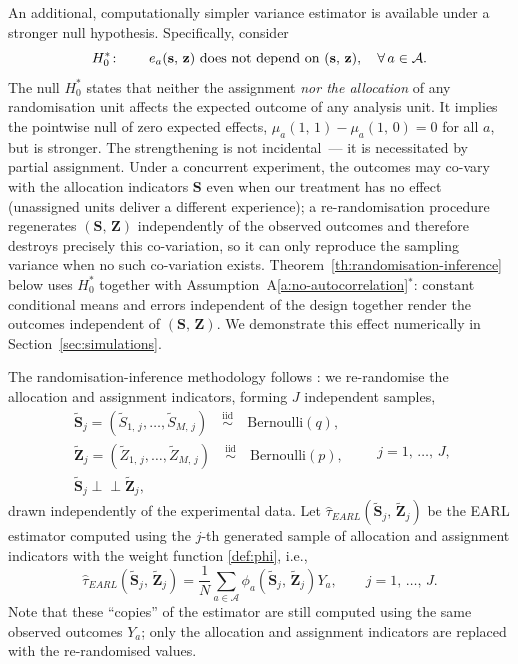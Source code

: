 \documentclass[sigconf,nonacm]{acmart}
\newcommand{\iidsim}{{\stackrel{\mathrm{iid}}{\sim}}}
\newcommand{\ind}{\perp\!\!\!\perp}
\begin{document}
An additional, computationally simpler variance estimator is available under a stronger null hypothesis. Specifically, consider
\begin{equation}\label{def:strong-null}
    H_0^*\colon\qquad e_a(\mathbf s,\,\mathbf z)\ \textup{does not depend on }(\mathbf s,\,\mathbf z),\quad \forall\,a\in\mathcal A.
\end{equation}
The null $H_0^*$ states that neither the assignment \emph{nor the allocation} of any randomisation unit affects the expected outcome of any analysis unit. It implies the pointwise null of zero expected effects, $\mu_a(1,\,1)-\mu_a(1,\,0)=0$ for all $a$, but is stronger. The strengthening is not incidental~--- it is necessitated by partial assignment. Under a concurrent experiment, the outcomes may co-vary with the allocation indicators $\mathbf S$ even when our treatment has no effect (unassigned units deliver a different experience); a re-randomisation procedure regenerates $(\mathbf S,\,\mathbf Z)$ independently of the observed outcomes and therefore destroys precisely this co-variation, so it can only reproduce the sampling variance when no such co-variation exists. Theorem~\ref{th:randomisation-inference} below uses $H_0^*$ together with Assumption~A\ref{a:no-autocorrelation}$^*$: constant conditional means and errors independent of the design together render the outcomes independent of $(\mathbf S,\,\mathbf Z)$. We demonstrate this effect numerically in Section~\ref{sec:simulations}.

The randomisation-inference methodology follows \cite[Section~4]{shi2025scalableanalysisbipartiteexperiments}: we re-randomise the allocation and assignment indicators, forming $J$ independent samples,
\begin{equation}\label{def:S-Z-samples}
    \begin{array}{c}
        \tilde{\mathbf{S}}_j = (\tilde S_{1,\,j},\ldots,\tilde S_{M,\,j}) \quad \iidsim \quad \mathrm{Bernoulli}(q),\\
        \tilde{\mathbf Z}_j = (\tilde Z_{1,\,j},\ldots,\tilde Z_{M,\,j}) \quad \iidsim \quad \mathrm{Bernoulli}(p),\\
        \tilde{\mathbf{S}}_j\ind \tilde{\mathbf Z}_j,
    \end{array}\qquad j=1,\,\ldots,\,J,
\end{equation}
drawn independently of the experimental data. Let $\hat\tau^{\phantom{1}}_{EARL}(\tilde {\mathbf S}_j,\,\tilde{\mathbf Z}_j)$ be the EARL estimator computed using the $j$-th generated sample of allocation and assignment indicators with the weight function \eqref{def:phi}, i.e.,
$$
    \hat\tau^{\phantom{1}}_{EARL}(\tilde {\mathbf S}_j,\,\tilde{\mathbf Z}_j) = \frac 1 N \sum_{a\in\mathcal{A}}\phi_a(\tilde {\mathbf S}_j,\,\tilde{\mathbf Z}_j)Y_a,\qquad j=1,\,\ldots,\,J.
$$
Note that these ``copies'' of the estimator are still computed using the same observed outcomes $Y_a$; only the allocation and assignment indicators are replaced with the re-randomised values.
\end{document}
